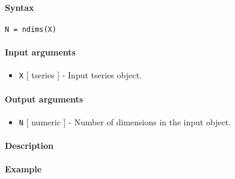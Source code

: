 


	\paragraph{Syntax}

\begin{verbatim}
N = ndims(X)
\end{verbatim}

\paragraph{Input arguments}

\begin{itemize}
\itemsep1pt\parskip0pt
\item
  \texttt{X} {[} tseries {]} - Input tseries object.
\end{itemize}

\paragraph{Output arguments}

\begin{itemize}
\itemsep1pt\parskip0pt
\item
  \texttt{N} {[} numeric {]} - Number of dimensions in the input object.
\end{itemize}

\paragraph{Description}

\paragraph{Example}


